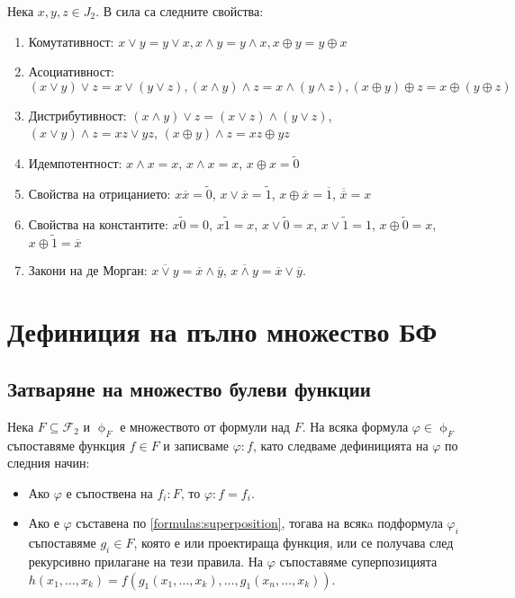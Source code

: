 \documentclass[fleqn,12pt]{article}
\begin{document}
\begin{flushleft}
Нека $x,y,z \in J_2$. В сила са следните свойства:
\begin{enumerate}
    \item Комутативност: $x \vee y = y \vee x, x \wedge y = y \wedge x, x \oplus y = y \oplus x$
    \item Асоциативност: $(x \vee y) \vee z = x \vee (y \vee z), (x \wedge y) \wedge z = x \wedge (y \wedge z), (x \oplus y) \oplus z = x \oplus (y \oplus z)$
    \item Дистрибутивност: $(x \wedge y) \vee z = (x \vee z) \wedge (y \vee z)$, $(x \vee y) \wedge z = xz \vee yz$, $(x \oplus y) \wedge z = xz \oplus yz$
    \item Идемпотентност: $x \wedge x = x$, $x \wedge x = x$, $x \oplus x = \widetilde{0}$
    \item Свойства на отрицанието: $x\overline{x} = \widetilde{0}$, $x \vee \overline{x} = \widetilde{1}$, $x \oplus \overline{x} = \overline{1}$, $\overline{\overline{{x}}} = x$
    \item Свойства на константите: $x\widetilde{0} = 0$, $x\widetilde{1} = x$, $x\vee \widetilde{0} = x$, $x \vee \widetilde{1} = 1$, $x \oplus \widetilde{0} = x$, $x \oplus \widetilde{1} = \overline{x}$
    \item Закони на де Морган: $\overline{x \vee y} = \overline{x} \wedge \overline{y}$, $\overline{x \wedge y} = \overline{x} \vee \overline{y}$.  
\end{enumerate}


\section{Дефиниция на пълно множество БФ}
\subsection{Затваряне на множество булеви функции}
Нека $F \subseteq \mathcal{F}_2$ и $\upphi_F$ е множеството от формули над $F$.
На всяка формула $\varphi \in \upphi_F$ съпоставяме функция $f \in F$ и записваме $\varphi : f$, като 
следваме дефиницията на $\varphi$ по следния начин:
\begin{itemize}
    \item Ако $\varphi$ е съпоствена на $f_i : F$, то $\varphi : f = f_i$.
    \item Ако е $\varphi$ съставена по \ref{formulas:superposition}, тогава на всякa подформула $\varphi_i$ съпоставяме $g_i \in F$, 
    която е или проектираща функция, или се получава след рекурсивно прилагане на тези правила. На $\varphi$ съпоставяме 
    суперпозицията $h(x_1, \dots, x_k) = f(g_1(x_1, \dots, x_k), \dots, g_1(x_n, \dots, x_k))$.
\end{itemize}


\end{flushleft}
\end{document}
